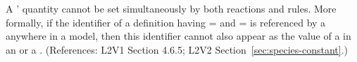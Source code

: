 A \Species' quantity cannot be set simultaneously by both
reactions and rules.  More formally, if the identifier of a
\Species definition having =
and = is referenced by a
\SpeciesReference anywhere in a model, then this identifier cannot
also appear as the value of a  in an
\AssignmentRule or a \RateRule.  (References: L2V1 Section 4.6.5;
L2V2 Section~\ref{sec:species-constant}.)
